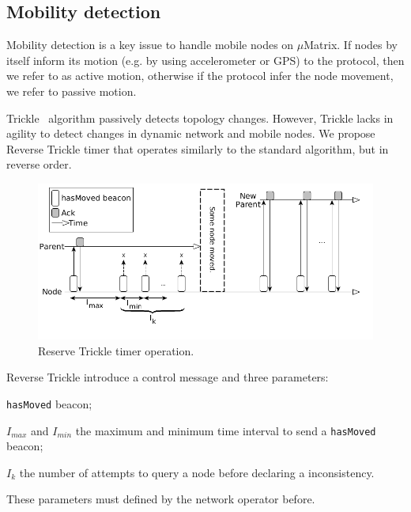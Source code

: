 \subsection{Mobility detection}
\label{subsec:reverse-tt}

Mobility detection is a key issue to handle mobile nodes on $\mu$Matrix. If nodes by itself inform its motion (e.g. by using accelerometer or GPS) to the protocol, then we refer to as active motion, otherwise if the protocol infer the node movement, we refer to passive motion.

Trickle~\cite{Levis:2004} algorithm passively detects topology changes. However, Trickle lacks in agility to detect changes in dynamic network and mobile nodes. We propose Reverse Trickle timer that operates similarly to the standard algorithm, but in reverse order. 

\begin{figure}[t!]
\centering
\includegraphics[width=1\linewidth]{img/reverse-tt}
\caption{Reserve Trickle timer operation.}
\label{fig:reverse-TT}
\end{figure}

Reverse Trickle introduce a control message and three parameters: 
\begin{inparaenum}[i)]
    \item \texttt{hasMoved} beacon;
    \item $I_{max}$ and $I_{min}$ the maximum and minimum time interval to send a \texttt{hasMoved} beacon;
    \item $I_k$ the number of attempts to query a node before declaring a inconsistency.
\end{inparaenum}
These parameters must defined by the network operator before.

